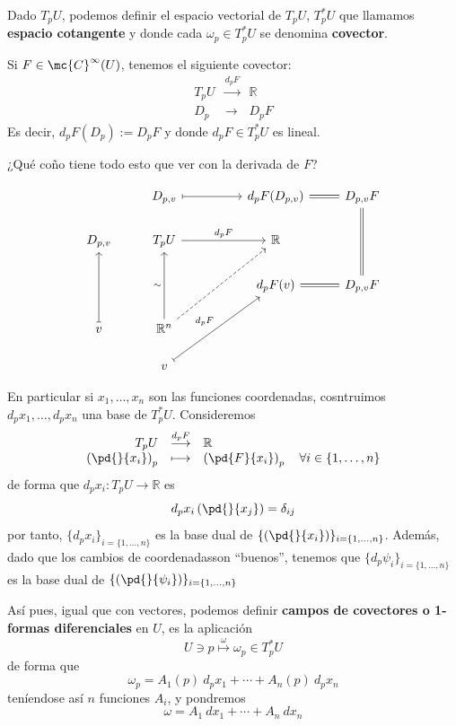 \begin{defi}
    Dado $T_pU$, podemos definir el espacio vectorial de $T_pU$, $T_p^{*}U$ que llamamos \textbf{espacio cotangente} y donde cada $\omega_p \in T_p^*U$ se denomina \textbf{covector}.

    Si $F\in \mc{C}^{\infty}(U)$, tenemos el siguiente covector:
    $$\begin{array}{rcl}
        T_pU & \overset{d_pF}{\longrightarrow} & \mathbb{R}  \\
        D_p & \longrightarrow & D_pF 
    \end{array}$$
    Es decir, $d_pF(D_p):=D_pF$ y donde $d_pF \in T^*_pU$ es lineal. 
\end{defi}
\begin{nota}
    ¿Qué coño tiene todo esto que ver con la derivada de $F$?
\end{nota}
\begin{prop}
    $$\begin{tikzcd}
    & D_{p,v} \ar[mapsto]{rr} &  & d_pF(D_{p,v})& \arrow[equal]{l}D_{p,v}F \\
    D_{p,v} & T_pU \ar{rr}{d_pF} & & \mathbb{R} \\
    & & & d_pF(v) & D_{p,v} F \arrow[l, equal] \arrow[uu, equal] \\
    v \arrow[uu, mapsto]  & \mathbb{R}^n \ar{uu}{\sim} \ar[rruu, dashrightarrow] & &  & \\
    & v \arrow[mapsto]{rruu}{d_pF}  &  
    \end{tikzcd}$$
\end{prop}
En particular si $x_1, \ldots, x_n$ son las funciones coordenadas, cosntruimos $d_px_1, \ldots, d_px_n$ una base de $T_p^*U$. Consideremos 
$$\begin{array}{rcl}
     T_pU& \overset{d_pF}{\longrightarrow} & \mathbb{R}  \\
     \left(\pd{}{x_i} \right)_p & \longmapsto & \left(\pd{F}{x_i}\right)_p \quad \forall i \in \{1, \ldots, n\}
\end{array}$$
de forma que $d_px_i: T_pU \longrightarrow \mathbb{R}$ es $$d_px_i\left(\pd{}{x_j}\right)=\delta_{ij}$$
por tanto, $\{d_px_i\}_{i=\{1,\ldots,n\}}$ es la base dual de $\{\left(\pd{}{x_i}\right)\}_{i=\{1,\ldots,n\}}$. Además, dado que los cambios de coordenadasson ``buenos'', tenemos que $\{d_p\psi_i\}_{i=\{1,\ldots,n\}}$ es la base dual de $\{\left(\pd{}{\psi_i}\right)\}_{i=\{1,\ldots,n\}}$
\begin{defi}
    Así pues, igual que con vectores, podemos definir \textbf{campos de covectores o 1-formas diferenciales} en $U$, es la aplicación
    $$U \ni p \overset{\omega}{\longmapsto} \omega_p \in T_p^*U$$
    de forma que 
    $$\omega_p=A_1(p) \: d_px_1 + \cdots + A_n(p) \: d_px_n$$
    teníendose así $n$ funciones $A_i$, y pondremos
    $$\omega=A_1 \: dx_1 + \cdots + A_n \: dx_n$$
\end{defi}

